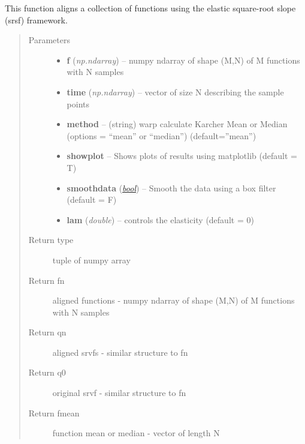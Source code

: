 \documentclass[letterpaper,10pt,english]{sphinxmanual}
\begin{document}
\begin{fulllineitems}
\label{time_warping:time_warping.srsf_align}
This function aligns a collection of functions using the elastic square-root slope (srsf) framework.
\begin{quote}\begin{description}
\item[{Parameters}] \leavevmode\begin{itemize}
\item {} 
\textbf{f} (\emph{np.ndarray}) -- numpy ndarray of shape (M,N) of M functions with N samples

\item {} 
\textbf{time} (\emph{np.ndarray}) -- vector of size N describing the sample points

\item {} 
\textbf{method} -- (string) warp calculate Karcher Mean or Median (options = ``mean'' or ``median'') (default=''mean'')

\item {} 
\textbf{showplot} -- Shows plots of results using matplotlib (default = T)

\item {} 
\textbf{smoothdata} (\href{http://docs.python.org/library/functions.html\#bool}{\emph{bool}}) -- Smooth the data using a box filter (default = F)

\item {} 
\textbf{lam} (\emph{double}) -- controls the elasticity (default = 0)

\end{itemize}

\item[{Return type}] \leavevmode
tuple of numpy array

\item[{Return fn}] \leavevmode
aligned functions - numpy ndarray of shape (M,N) of M functions with N samples

\item[{Return qn}] \leavevmode
aligned srvfs - similar structure to fn

\item[{Return q0}] \leavevmode
original srvf - similar structure to fn

\item[{Return fmean}] \leavevmode
function mean or median - vector of length N


\end{description}
\end{quote}
\end{fulllineitems}
\end{document}
